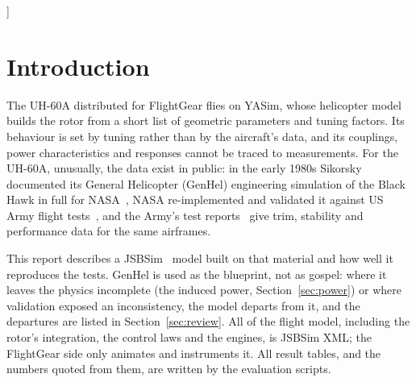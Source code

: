\documentclass[10pt,a4paper,twocolumn]{article}
\begin{document}
\begin{@twocolumnfalse}
\begin{abstract}
\NRn{} usable cases (mean \NRmod{} against \NRgh\,deg/s). Hovering in winds from every direction, where GenHel's wash at the tail doubles
the pedal's swing, the ring wake brings the pedal error from \NXGped{} to \NXBped\,in rms. The hover pedal step exposed a missing term: the
rotor keeps its own angular momentum, so its speed relative to the airframe must follow the airframe's yaw; with that term the yaw-rate error
after the step fell from 5.5 to \NRpedrms\,deg/s. Deficiencies are quantified: cruise power 2--10\,\% above one
of two conflicting test sources, a weak pitch-up after an aft step at 100\,kt (\NQmod{} against \NQtest\,deg/s), an angle-of-attack
derivative $M_w$ a third of that of TM-85890's model, half the bank change between climb and descent that the aircraft shows, and a tail
rotor that reaches its stall near the top speed, where the aircraft still had pedal to spare.
\end{abstract}
\vspace{6pt}
\end{@twocolumnfalse}
]

\section{Introduction}
The UH-60A distributed for FlightGear flies on YASim, whose helicopter model builds the rotor from a short list of geometric
parameters and tuning factors. Its behaviour is set by tuning rather than by the aircraft's data, and its couplings, power
characteristics and responses cannot be traced to measurements. For the UH-60A, unusually,
the data exist in public: in the early 1980s Sikorsky documented its General Helicopter (GenHel) engineering simulation of
the Black Hawk in full for NASA~\cite{gh}, NASA re-implemented and validated it against US Army flight tests~\cite{hb,bal},
and the Army's test reports~\cite{a7717,a7924,a8324} give trim, stability and performance data for the same airframes.

This report describes a JSBSim~\cite{jsbsim} model built on that material and how well it reproduces the tests. GenHel is used
as the blueprint, not as gospel: where it leaves the physics incomplete (the induced power, Section~\ref{sec:power}) or where
validation exposed an inconsistency, the model departs from it, and the departures are listed in Section~\ref{sec:review}.
All of the flight model, including the rotor's integration, the control laws and the engines, is JSBSim XML; the FlightGear side
only animates and instruments it. All result tables, and the numbers quoted from them, are written by the evaluation scripts.
\end{document}
